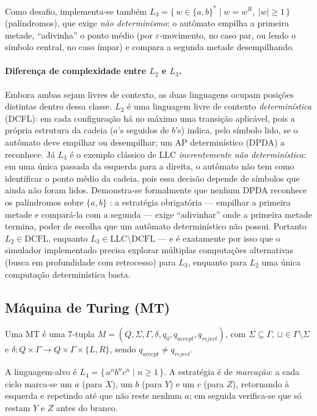 \documentclass[12pt,a4paper]{article}
\begin{document}
Como desafio, implementa-se também
$L_3 = \{\, w \in \{a,b\}^* \mid w = w^R,\ |w| \geq 1 \,\}$ (palíndromos), que exige
\emph{não determinismo}: o autômato empilha a primeira metade, ``adivinha'' o
ponto médio (por $\varepsilon$-movimento, no caso par, ou lendo o símbolo central,
no caso ímpar) e compara a segunda metade desempilhando.

\paragraph{Diferença de complexidade entre $L_2$ e $L_3$.}
Embora ambas sejam livres de contexto, as duas linguagens ocupam posições
distintas dentro dessa classe. $L_2$ é uma linguagem livre de contexto
\emph{determinística} (DCFL): em cada configuração há no máximo uma transição
aplicável, pois a própria estrutura da cadeia ($a$'s seguidos de $b$'s) indica,
pelo símbolo lido, se o autômato deve empilhar ou desempilhar; um AP
determinístico (DPDA) a reconhece. Já $L_3$ é o exemplo clássico de LLC
\emph{inerentemente não determinística}: em uma única passada da esquerda para a
direita, o autômato não tem como identificar o ponto médio da cadeia, pois essa
decisão depende de símbolos que ainda não foram lidos. Demonstra-se formalmente
que nenhum DPDA reconhece os palíndromos sobre $\{a,b\}$ \cite{hopcroft}: a
estratégia obrigatória --- empilhar a primeira metade e compará-la com a segunda
--- exige ``adivinhar'' onde a primeira metade termina, poder de escolha que um
autômato determinístico não possui. Portanto $L_2 \in \mathrm{DCFL}$, enquanto
$L_3 \in \mathrm{LLC} \setminus \mathrm{DCFL}$ --- e é exatamente por isso que o
simulador implementado precisa explorar múltiplas computações alternativas
(busca em profundidade com retrocesso) para $L_3$, enquanto para $L_2$ uma única
computação determinística basta.

\subsection{Máquina de Turing (MT)}
Uma MT é uma 7-tupla $M = (Q, \Sigma, \Gamma, \delta, q_0, q_{accept}, q_{reject})$,
com $\Sigma \subseteq \Gamma$, $\sqcup \in \Gamma \setminus \Sigma$ e
$\delta: Q \times \Gamma \to Q \times \Gamma \times \{L, R\}$, sendo
$q_{accept} \neq q_{reject}$.

A linguagem-alvo é $L_4 = \{\, a^n b^n c^n \mid n \geq 1 \,\}$. A estratégia é de
\emph{marcação}: a cada ciclo marca-se um $a$ (para $X$), um $b$ (para $Y$) e um
$c$ (para $Z$), retornando à esquerda e repetindo até que não reste nenhum $a$;
em seguida verifica-se que só restam $Y$ e $Z$ antes do branco.
\end{document}
